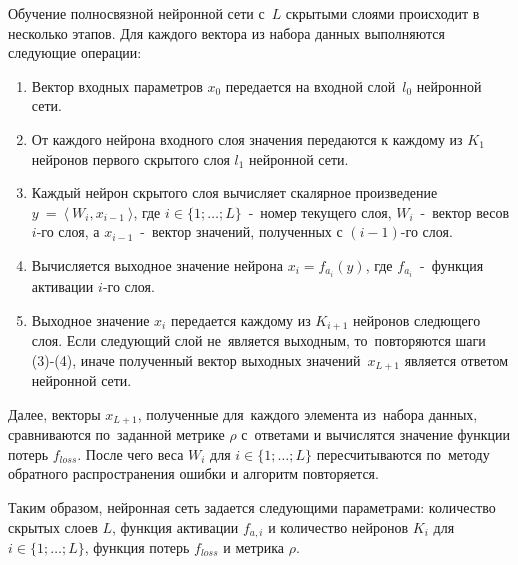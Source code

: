 Обучение полносвязной\cite[с.\,44]{bib:neural_networks} нейронной сети с~$L$ скрытыми слоями\cite[с.\,43]{bib:neural_networks} происходит в несколько этапов. Для каждого вектора из набора данных выполняются следующие операции:
\begin{enumerate}\label{alg:neural_education}
\item Вектор входных параметров $x_0$ передается на входной слой~$l_0$ нейронной сети.
\item От каждого нейрона входного слоя значения передаются к каждому из $K_1$ нейронов первого скрытого слоя $l_1$ нейронной сети.
\item Каждый нейрон скрытого слоя вычисляет скалярное произведение \newline $y~=~\langle~W_i, x_{i-1}~\rangle$, где $i\in\{1; \dots; L\}$~-~номер текущего слоя, $W_i$~-~вектор весов $i$-го слоя, а $x_{i-1}$~-~вектор значений, полученных с $(i-1)$-го слоя.
\item Вычисляется выходное значение нейрона $x_i = f_{a_i}(y)$, где $f_{a_i}$~-~функция активации\cite[с.\,151]{bib:neural_networks2} $i$-го слоя.
\item Выходное значение $x_i$ передается каждому из $K_{i+1}$ нейронов следющего слоя. Если следующий слой не~является выходным, то~повторяются шаги (3)-(4), иначе полученный вектор выходных значений~$x_{L+1}$ является ответом нейронной сети.
\end{enumerate}
Далее, векторы $x_{L+1}$, полученные для~каждого элемента из~набора данных, сравниваются по~заданной метрике\cite{bib:metrics} $\rho$ с~ответами
и вычислятся значение функции потерь\cite[с.\,65]{bib:neural_networks2} $f_{loss}$. После чего веса $W_i$ для $i\in\{1; \dots; L\}$ пересчитываются по~методу обратного распространения ошибки\cite[с.\,151-184]{bib:neural_networks2} и алгоритм повторяется.

Таким образом, нейронная сеть задается следующими параметрами: количество скрытых слоев $L$, функция активации $f_{a,i}$ и количество нейронов $K_i$ для $i\in\{1; \dots; L\}$, функция потерь $f_{loss}$ и метрика $\rho$.

